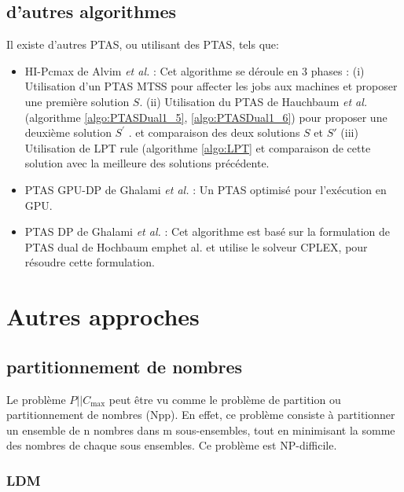 \documentclass[a4paper,12pt]{report}
\theoremstyle{plain}				%
\theoremstyle{definition}				%
\newcommand\problemGrahamP{$P||C_{\max}$\xspace}
\begin{document}
\subsection{d'autres algorithmes}
Il existe d'autres PTAS, ou utilisant des PTAS, tels que:
\begin{itemize}
\item HI-Pcmax de Alvim \emph{et al.} \cite{alvim2004hybrid}:
  Cet algorithme se déroule en 3 phases :
  (i) Utilisation d'un PTAS MTSS pour affecter
  les jobs aux 	machines et proposer une première solution $S$.
  (ii) Utilisation du PTAS de
  Hauchbaum \emph{et al.} (algorithme
  \ref{algo:PTASDual1_5}, \ref{algo:PTASDual1_6})
  pour proposer une deuxième solution $S^\prime$ .
  et comparaison des deux solutions $S$ et $S\prime$
  (iii) Utilisation de LPT rule (algorithme \ref{algo:LPT} et
  comparaison de cette solution avec la meilleure des solutions
  précédente.

\item PTAS GPU-DP de Ghalami \emph{et al.} \cite{li2018gpu}:
  Un PTAS optimisé pour l'exécution en GPU.

\item PTAS DP de Ghalami \emph{et al.} \cite{ghalami2019scheduling}:
Cet algorithme est basé sur la formulation de PTAS dual de Hochbaum emph{et al.} et utilise le solveur CPLEX, pour résoudre cette formulation.

\end{itemize}








\section{Autres approches} \label{sec:autresApproches}

\subsection{partitionnement de nombres}
\label{ssec:autresApprochesPartitionnement}

Le problème \problemGrahamP peut être vu comme le problème de
partition ou partitionnement de nombres (Npp).
En effet, ce problème consiste à partitionner un ensemble de n nombres
dans m sous-ensembles, tout en minimisant la somme des nombres de
chaque sous ensembles.
Ce problème est NP-difficile.

\subsubsection{LDM}
\end{document}

